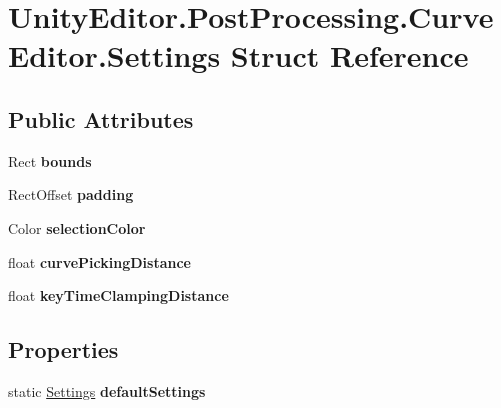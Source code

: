 \hypertarget{struct_unity_editor_1_1_post_processing_1_1_curve_editor_1_1_settings}{}\section{Unity\+Editor.\+Post\+Processing.\+Curve\+Editor.\+Settings Struct Reference}
\label{struct_unity_editor_1_1_post_processing_1_1_curve_editor_1_1_settings}
\subsection*{Public Attributes}
\begin{DoxyCompactItemize}
\item 
\mbox{\label{struct_unity_editor_1_1_post_processing_1_1_curve_editor_1_1_settings_a146ecea52f13c5690007a081577c09d1}} 
Rect {\bfseries bounds}
\item 
\mbox{\label{struct_unity_editor_1_1_post_processing_1_1_curve_editor_1_1_settings_a70cb607e1a1ac18ccbba3bbbfbf4ea69}} 
Rect\+Offset {\bfseries padding}
\item 
\mbox{\label{struct_unity_editor_1_1_post_processing_1_1_curve_editor_1_1_settings_af2ad5ff411e541438041f4ad90f8815a}} 
Color {\bfseries selection\+Color}
\item 
\mbox{\label{struct_unity_editor_1_1_post_processing_1_1_curve_editor_1_1_settings_aacadabfe0ea214d74c5f1742bf7295b0}} 
float {\bfseries curve\+Picking\+Distance}
\item 
\mbox{\label{struct_unity_editor_1_1_post_processing_1_1_curve_editor_1_1_settings_ab4c48700684d8b5dc374b7a03b26f44a}} 
float {\bfseries key\+Time\+Clamping\+Distance}
\end{DoxyCompactItemize}
\subsection*{Properties}
\begin{DoxyCompactItemize}
\item 
\mbox{\label{struct_unity_editor_1_1_post_processing_1_1_curve_editor_1_1_settings_a58c315048e65e1ac57360b771dd55135}} 
static \hyperlink{struct_unity_editor_1_1_post_processing_1_1_curve_editor_1_1_settings}{Settings} {\bfseries default\+Settings}
\end{DoxyCompactItemize}



